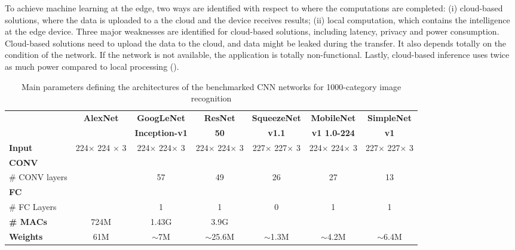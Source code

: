To achieve machine learning at the edge, two ways are identified with respect to where the computations are completed: (i) cloud-based solutions, where the data is uploaded to a the cloud and the device receives results; (ii) local computation, which contains the intelligence at the edge device. Three major weaknesses are identified for cloud-based solutions, including latency, privacy and power consumption.
Cloud-based solutions need to upload the data to the cloud, and data might be leaked during the transfer. It also depends totally on the condition of the network. If the network is not available, the application is totally non-functional. Lastly, cloud-based inference uses twice as much power compared to local processing (\cite{Lane2016}). 

\begin{table}[H]
\renewcommand{\arraystretch}{.75}
\small
\centering
\caption{Main parameters defining the architectures of the benchmarked CNN networks for 1000-category image recognition \cite{Montero2018}\cite{Hasanpour2016}}
\begin{tabular}{lcccccc}
\toprule
	&	\textbf{AlexNet}	&	\textbf{GoogLeNet}	&	\textbf{ResNet}	&	\textbf{SqueezeNet}	&	\textbf{MobileNet}	&	\textbf{SimpleNet}	\\
	& \textbf{}&\textbf{Inception-v1}	&	\textbf{50}		&	\textbf{v1.1}		&	\textbf{v1 1.0-224}	&	\textbf{v1}	\\
	\midrule
\textbf{Input}	& 224$\times$ 224 $\times$ 3 & 224$\times$ 224$\times$ 3 & 224$\times$ 224$\times$ 3 & 227$\times$ 227$\times$ 3 & 224$\times$ 224$\times$ 3 & 227$\times$ 227$\times$ 3 \\
\midrule
\textbf{CONV} \\
\# CONV layers	&		&	57	&	49	&	26	&	27	&	13	\\
\midrule
\textbf{FC} \\
\# FC Layers	&		&	1	&	1	&	0	&	1	&	1	\\
\midrule

\textbf{\# MACs}	&	724M	&	1.43G	&	3.9G \\
\textbf{Weights}	&	61M	&	$\sim$7M	&	$\sim$25.6M	&	$\sim$1.3M	&	$\sim$4.2M	&	$\sim$6.4M \\
\bottomrule
\end{tabular}
\end{table}



